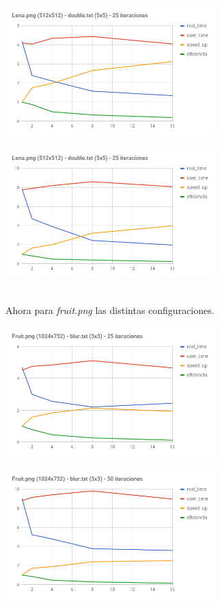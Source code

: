 \documentclass[letterpaper,10pt]{article}
\begin{document}
\begin{minipage}{0.5\linewidth}
\includegraphics[height=5cm]{chart__2_.png}
\end{minipage}
\begin{minipage}{0.5\linewidth}
\includegraphics[height=5cm]{chart__3_.png}
\end{minipage}
\\
Ahora para \textit{fruit.png} las distintas configuraciones.\\

\begin{minipage}{0.5\linewidth}
\includegraphics[height=5cm]{chart__4_.png}
\end{minipage}
\begin{minipage}{0.5\linewidth}
\includegraphics[height=5cm]{chart__5_.png}
\end{minipage}
\end{document}
